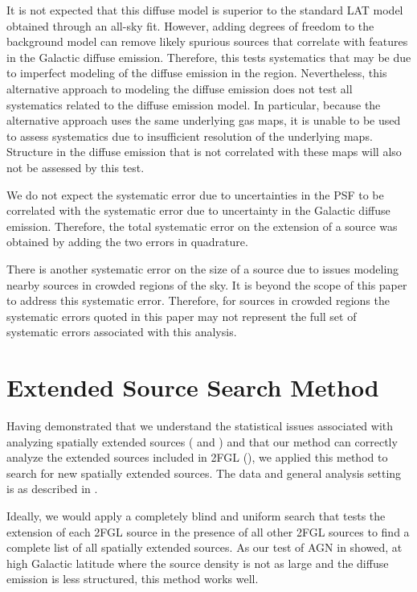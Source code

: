 It is not expected that this diffuse model is superior to the standard
LAT model obtained through an all-sky fit.  However, adding degrees of
freedom to the background model can remove likely spurious sources that
correlate with features in the Galactic diffuse emission.  Therefore,
this tests systematics that may be due to imperfect modeling of the
diffuse emission in the region.  Nevertheless, this alternative approach
to modeling the diffuse emission does not test all systematics related
to the diffuse emission model. In particular, because the alternative
approach uses the same underlying gas maps, it is unable to be used to
assess systematics due to insufficient resolution of the underlying
maps. Structure in the diffuse emission that is not correlated with
these maps will also not be assessed by this test.

We do not expect the systematic error due to uncertainties in the PSF
to be correlated with the systematic error due to uncertainty in the
Galactic diffuse emission. Therefore, the total systematic error on the
extension of a source was obtained by adding the two errors in quadrature.

There is another systematic error on the size of a source due to issues
modeling nearby sources in crowded regions of the sky. It is beyond
the scope of this paper to address this systematic error. Therefore,
for sources in crowded regions the systematic errors quoted in this
paper may not represent the full set of systematic errors associated
with this analysis.

\section{Extended Source Search Method}

Having demonstrated that we understand the statistical
issues associated with analyzing spatially extended sources
( and ) and
that our method can correctly analyze the extended sources included in
2FGL (), we applied this method to search for new
spatially extended \gev sources.  The data and general analysis setting
is as described in .

Ideally, we would apply a completely blind and uniform search that
tests the extension of each 2FGL source in the presence of all other
2FGL sources to find a complete list of all spatially extended sources.
As our test of AGN in  showed, at high Galactic
latitude where the source density is not as large and the diffuse emission
is less structured, this method works well.

